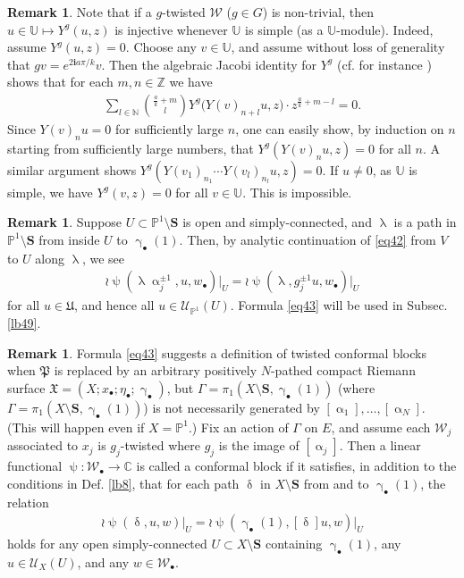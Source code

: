 \documentclass[12pt,a4paper,notitlepage]{article}
\theoremstyle{definition}
\newtheorem{rem}[df]{Remark}
\theoremstyle{plain}
\newcommand{\fk}{\mathfrak}
\newcommand{\mc}{\mathcal}
\newcommand{\scr}{\mathscr}
\newcommand{\im}{\mathbf{i}}
\newcommand{\blt}{\bullet}
\newcommand{\Ubb}{\mathbb U}
\newcommand{\Cbb}{\mathbb C}
\newcommand{\Nbb}{\mathbb N}
\newcommand{\Zbb}{\mathbb Z}
\newcommand{\Pbb}{\mathbb P}
\newcommand{\Sbf}{\mathbf{S}}
\numberwithin{equation}{subsection}
\begin{document}
\begin{rem}
	Note that if a $g$-twisted $\mc W$ ($g\in G$) is non-trivial, then $u\in\Ubb\mapsto Y^g(u,z)$ is injective whenever $\Ubb$ is simple (as a $\Ubb$-module). Indeed, assume $Y^g(u,z)=0$. Choose any $v\in \Ubb$, and assume without loss of generality that $gv=e^{2\im a\pi/k}v$. Then the algebraic Jacobi identity for $Y^g$ (cf. for instance \cite[Sec. 10]{Gui21b}) shows that for each $m,n\in\Zbb$ we have
	\begin{align*}
		\sum_{l\in\Nbb}{\frac ak+m\choose l} Y^g\big(Y(v)_{n+l}u,z\big)\cdot z^{\frac ak+m-l}=0.
	\end{align*}
	Since $Y(v)_nu=0$ for sufficiently large $n$, one can easily show, by induction on $n$ starting from sufficiently large numbers, that $Y^g(Y(v)_nu,z)=0$ for all $n$. A similar argument shows $Y^g(Y(v_1)_{n_1}\cdots Y(v_l)_{n_l}u,z)=0$. If $u\neq 0$, as $\Ubb$ is simple, we have $Y^g(v,z)=0$ for all $v\in\Ubb$. This is impossible.
\end{rem}


\begin{rem}
	Suppose $U\subset\Pbb^1\setminus\Sbf$ is open and simply-connected, and $\uplambda$ is a path in $\Pbb^1\setminus\Sbf$ from inside $U$ to $\upgamma_\blt(1)$. Then, by analytic continuation of \eqref{eq42} from $V$ to $U$ along $\uplambda$, we see
	\begin{align}
		\wr\uppsi(\uplambda\upalpha_j^{\pm1},u,w_\blt)\big|_U=	\wr\uppsi(\uplambda,g_j^{\pm1}u,w_\blt)\big|_U\label{eq43}
	\end{align}
	for all $u\in\fk U$, and hence all $u\in\scr U_{\Pbb^1}(U)$. Formula \eqref{eq43} will be used in Subsec. \ref{lb49}.
\end{rem}


\begin{rem}\label{lb64}
Formula \eqref{eq43} suggests a definition of twisted conformal blocks when $\fk P$ is replaced by an arbitrary positively $N$-pathed compact Riemann surface $\fk X=(X;x_\blt;\eta_\blt;\upgamma_\blt)$, but  $\Gamma=\pi_1(X\setminus\Sbf,\upgamma_\blt(1))$ (where $\Gamma=\pi_1(X\setminus\Sbf,\upgamma_\blt(1))$) is not necessarily generated by $[\upalpha_1],\dots,[\upalpha_N]$. (This will happen even if $X=\Pbb^1$.) Fix an action of $\Gamma$ on $E$, and assume each $\mc W_j$ associated to $x_j$ is $g_j$-twisted where $g_j$ is the image of $[\upalpha_j]$. Then a  linear functional $\uppsi:\mc W_\blt\rightarrow\Cbb$ is called a  conformal block  if it satisfies, in addition to the conditions in Def. \ref{lb8}, that for each path $\updelta$ in $X\setminus\Sbf$ from and to $\upgamma_\blt(1)$, the relation
\begin{align}
\wr\uppsi(\updelta,u,w)\big|_U=	\wr\uppsi(\upgamma_\blt(1),[\updelta]u,w)\big|_U	
\end{align}
holds for any open simply-connected $U\subset X\setminus\Sbf$ containing $\upgamma_\blt(1)$, any $u\in\scr U_X(U)$, and any $w\in\mc W_\blt$.
\end{rem}
\end{document}
